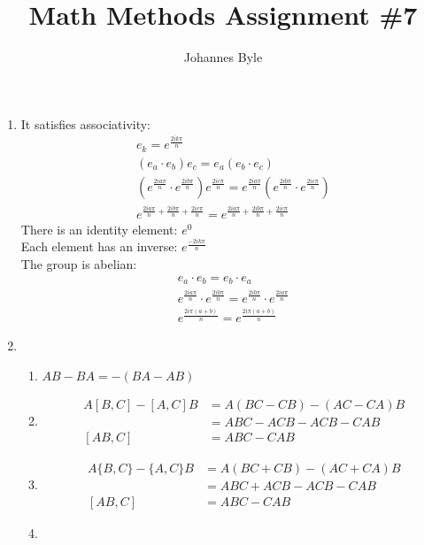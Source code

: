 \documentclass[11pt]{article}
\title{Math Methods Assignment \#7}
\author{Johannes Byle}
\begin{document}
    \maketitle
    \begin{enumerate}
        \item
        It satisfies associativity:
        \begin{gather*}
            e_k=e^{\frac{2ik\pi}{n}}\\
            (e_a\cdot e_b)e_c=e_a(e_b\cdot e_c)\\
            (e^{\frac{2ia\pi}{n}}\cdot e^{\frac{2ib\pi}{n}})e^{\frac{2ic\pi}{n}}=e^{\frac{2ia\pi}{n}}(e^{\frac{2ib\pi}{n}}\cdot e^{\frac{2ic\pi}{n}})\\
            e^{\frac{2ia\pi}{n}+\frac{2ib\pi}{n}+\frac{2ic\pi}{n}}=e^{\frac{2ia\pi}{n}+\frac{2ib\pi}{n}+\frac{2ic\pi}{n}}
        \end{gather*}
        There is an identity element: $e^{0}$\\
        Each element has an inverse: $e^{\frac{-2ik\pi}{n}}$\\
        The group is abelian:
        \begin{gather*}
            e_a\cdot e_b=e_b\cdot e_a\\
            e^{\frac{2ia\pi}{n}}\cdot e^{\frac{2ib\pi}{n}}=e^{\frac{2ib\pi}{n}}\cdot e^{\frac{2ia\pi}{n}}\\
            e^{\frac{2i\pi(a+b)}{n}}=e^{\frac{2i\pi(a+b)}{n}}
        \end{gather*}
        \item
        \begin{enumerate}
            \item $AB-BA=-(BA-AB)$
            \item
            \begin{align*}
                A[B,C]-[A,C]B&=A(BC-CB)-(AC-CA)B\\
                &=ABC-ACB-ACB-CAB\\
                [AB,C]&=ABC-CAB
            \end{align*}
            \item
            \begin{align*}
                A\{B,C\}-\{A,C\}B&=A(BC+CB)-(AC+CA)B\\
                &=ABC+ACB-ACB-CAB\\
                [AB,C]&=ABC-CAB
            \end{align*}
            \item

\end{enumerate}
\end{enumerate}
\end{document}
